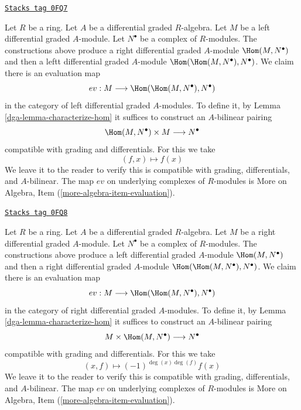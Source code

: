 \begin{remark}
\label{dga-remark-evaluation-map-left}
\href{https://stacks.math.columbia.edu/tag/0FQ7}{\texttt{Stacks tag 0FQ7}}

Let $R$ be a ring. Let $A$ be a differential graded $R$-algebra.
Let $M$ be a left differential graded $A$-module. Let
$N^\bullet$ be a complex of $R$-modules. The constructions above
produce a right differential graded $A$-module $\Hom(M, N^\bullet)$
and then a leftt differential graded $A$-module
$\Hom(\Hom(M, N^\bullet), N^\bullet)$. We claim there is an
evaluation map
$$
ev : M \longrightarrow \Hom(\Hom(M, N^\bullet), N^\bullet)
$$
in the category of left differential graded $A$-modules. To define it, by
Lemma \ref{dga-lemma-characterize-hom} it suffices to construct an
$A$-bilinear pairing
$$
\Hom(M, N^\bullet) \times M \longrightarrow N^\bullet
$$
compatible with grading and differentials. For this we take
$$
(f, x) \longmapsto f(x)
$$
We leave it to the reader to verify this is compatible with grading,
differentials, and $A$-bilinear. The map $ev$ on underlying complexes
of $R$-modules is More on Algebra, Item (\ref{more-algebra-item-evaluation}).
\end{remark}

\begin{remark}
\label{dga-remark-evaluation-map-right}
\href{https://stacks.math.columbia.edu/tag/0FQ8}{\texttt{Stacks tag 0FQ8}}

Let $R$ be a ring. Let $A$ be a differential graded $R$-algebra.
Let $M$ be a right differential graded $A$-module. Let
$N^\bullet$ be a complex of $R$-modules. The constructions above
produce a left differential graded $A$-module $\Hom(M, N^\bullet)$
and then a right differential graded $A$-module
$\Hom(\Hom(M, N^\bullet), N^\bullet)$. We claim there is an evaluation map
$$
ev : M \longrightarrow \Hom(\Hom(M, N^\bullet), N^\bullet)
$$
in the category of right differential graded $A$-modules. To define it, by
Lemma \ref{dga-lemma-characterize-hom} it suffices to construct an
$A$-bilinear pairing
$$
M \times \Hom(M, N^\bullet) \longrightarrow N^\bullet
$$
compatible with grading and differentials. For this we take
$$
(x, f) \longmapsto (-1)^{\deg(x)\deg(f)}f(x)
$$
We leave it to the reader to verify this is compatible with grading,
differentials, and $A$-bilinear. The map $ev$ on underlying complexes
of $R$-modules is More on Algebra, Item (\ref{more-algebra-item-evaluation}).
\end{remark}

